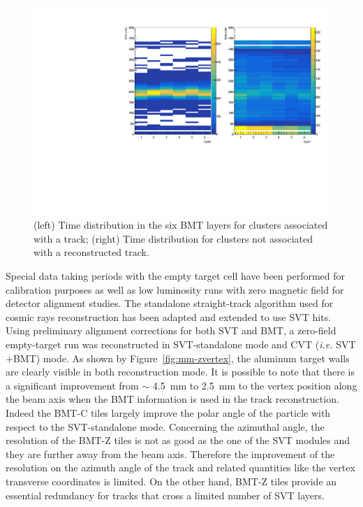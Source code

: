 \begin{figure}[htb]
 \includegraphics[width=\columnwidth,keepaspectratio]{images/align_cls_time.pdf}
 \caption{(left) Time distribution in the six BMT layers for clusters associated with a track; (right) Time distribution for clusters not associated with a reconstructed track.}
 \label{fig:mm-beam_cls_time}
\end{figure}


Special data taking periods with the empty target cell have been performed for calibration purposes as well as low luminosity runs with zero magnetic field for detector alignment studies. The standalone straight-track algorithm used for cosmic rays reconstruction has been adapted and extended to use SVT hits. Using preliminary alignment corrections for both SVT and BMT, a zero-field empty-target run was reconstructed in SVT-standalone mode and CVT (\emph{i.e.} SVT$+$BMT) mode. As shown by Figure~\ref{fig:mm-zvertex}, the aluminum target walls are clearly visible in both reconstruction mode. It is possible to note that there is a significant improvement from $\sim$ 4.5~mm to 2.5~mm to the vertex position along the beam axis when the BMT information is used in the track reconstruction. Indeed the BMT-C tiles largely improve the polar angle of the particle with respect to the SVT-standalone mode. Concerning the azimuthal angle, the resolution of the BMT-Z tiles is not as good as the one of the SVT modules and they are further away from the beam axis. Therefore the improvement of the resolution on the azimuth angle of the track and related quantities like the  vertex transverse coordinates is limited. On the other hand, BMT-Z tiles provide an essential redundancy for tracks that cross a limited number of SVT layers.

